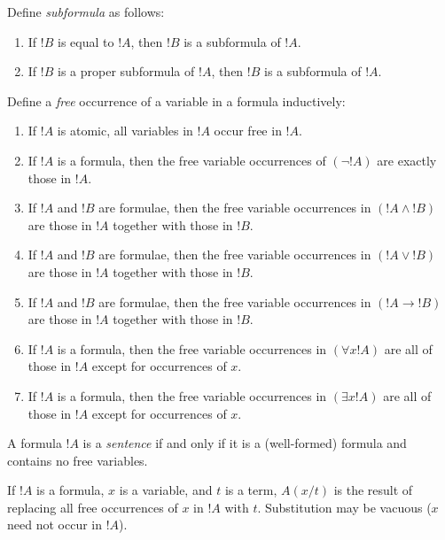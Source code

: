 \documentclass[syntax-and-semantics]{subfiles}
\begin{document}
\begin{defn}[Subformula]
Define \emph{subformula} as follows:
\begin{enumerate}
\item If $!B$ is equal to $!A$, then $!B$ is a subformula of $!A$.
\item If $!B$ is a proper subformula of $!A$, then $!B$ is a subformula of $!A$.
\end{enumerate}
\end{defn}


\begin{defn}
Define a \emph{free} occurrence of a variable in a formula inductively:
\begin{enumerate}
\item If $!A$ is atomic, all variables in $!A$ occur free in $!A$.
\item If $!A$ is a formula, then the free variable occurrences of $(\lnot !A)$ are exactly those in $!A$.
\item If $!A$ and $!B$ are formulae, then the free variable occurrences in $(!A \land !B)$ are those in $!A$ together with those in $!B$.
\item If $!A$ and $!B$ are formulae, then the free variable occurrences in $(!A \lor !B)$ are those in $!A$ together with those in $!B$.
\item If $!A$ and $!B$ are formulae, then the free variable occurrences in $(!A \rightarrow !B)$ are those in $!A$ together with those in $!B$.
\item If $!A$ is a formula, then the free variable occurrences in $(\forall x !A)$ are all of those in $!A$ except for occurrences of $x$.
\item If $!A$ is a formula, then the free variable occurrences in $(\exists x !A)$ are all of those in $!A$ except for occurrences of $x$.
\end{enumerate}
\end{defn}

\begin{defn}[Sentence]
A formula $!A$ is a \emph{sentence} if and only if it is a (well-formed) formula and contains no free variables.\end{defn}


\begin{defn}
If $!A$ is a formula, $x$ is a variable, and $t$ is a term, $A(x/t)$ is the result of replacing all free occurrences of $x$ in $!A$ with $t$. Substitution may be vacuous ($x$ need not occur in $!A$). \end{defn}
\end{document}
